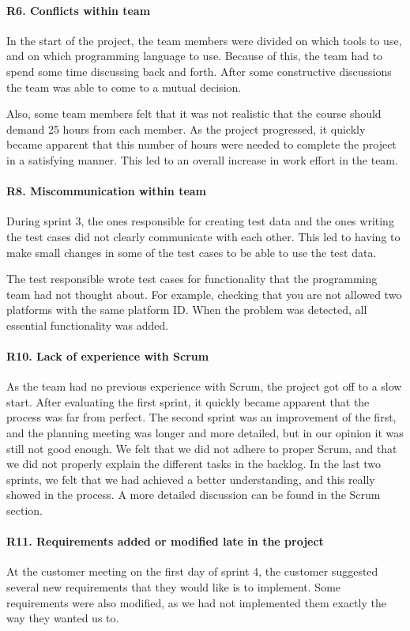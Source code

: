 \paragraph{R6. Conflicts within team}
In the start of the project, the team members were divided on which tools to use, and on which programming language to use. Because of this, the team had to spend some time discussing back and forth. After some constructive discussions the team was able to come to a mutual decision.

Also, some team members felt that it was not realistic that the course should demand 25 hours from each member. As the project progressed, it quickly became apparent that this number of hours were needed to complete the project in a satisfying manner. This led to an overall increase in work effort in the team.

\paragraph{R8. Miscommunication within team}
During sprint 3, the ones responsible for creating test data and the ones writing the test cases did not clearly communicate with each other. This led to having to make small changes in some of the test cases to be able to use the test data.

The test responsible wrote test cases for functionality that the programming team had not thought about. For example, checking that you are not allowed two platforms with the same platform ID.
When the problem was detected, all essential functionality was added.

\paragraph{R10. Lack of experience with Scrum}
As the team had no previous experience with Scrum, the project got off to a slow start.
After evaluating the first sprint, it quickly became apparent that the process was far from perfect.
The second sprint was an improvement of the first, and the planning meeting was longer and more detailed, but in our opinion it was still not good enough. We felt that we did not adhere to proper Scrum, and that we did not properly explain the different tasks in the backlog. In the last two sprints, we felt that we had achieved a better understanding, and this really showed in the process. A more detailed discussion can be found in the Scrum section.

\paragraph{R11. Requirements added or modified late in the project}
At the customer meeting on the first day of sprint 4, the customer suggested several new requirements that they would like is to implement. Some requirements were also modified, as we had not implemented them exactly the way they wanted us to.

